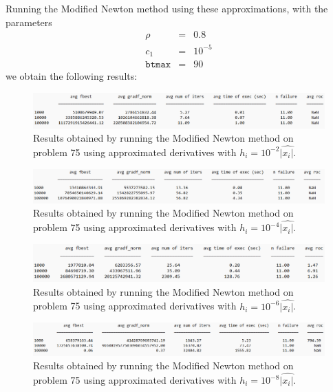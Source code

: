 Running the Modified Newton method using these approximations, with the parameters 
\begin{eqnarray*}
    \rho &=& 0.8 \\
    c_1 &=& 10^{-5} \\
    \texttt{btmax} &=& 90
\end{eqnarray*}
we obtain the following results:

\begin{figure}[H]
    \centering
    \includegraphics[width=1\textwidth]{img/pb75_table_MN_REL_2.png}
    \caption{Results obtained by running the Modified Newton method on problem 75 using approximated derivatives with $h_i=10^{-2}|\hat{x_i|}$.} 
\end{figure}

\begin{figure}[H]
    \centering
    \includegraphics[width=1\textwidth]{img/pb75_table_MN_REL_4.png}
    \caption{Results obtained by running the Modified Newton method on problem 75 using approximated derivatives with $h_i=10^{-4}|\hat{x_i|}$.} 
\end{figure}

\begin{figure}[H]
    \centering
    \includegraphics[width=1\textwidth]{img/pb75_table_MN_REL_6.png}
    \caption{Results obtained by running the Modified Newton method on problem 75 using approximated derivatives with $h_i=10^{-6}|\hat{x_i|}$.} 
\end{figure}

\begin{figure}[H]
    \centering
    \includegraphics[width=1\textwidth]{img/pb75_table_MN_REL_8.png}
    \caption{Results obtained by running the Modified Newton method on problem 75 using approximated derivatives with $h_i=10^{-8}|\hat{x_i|}$.} 
\end{figure}

